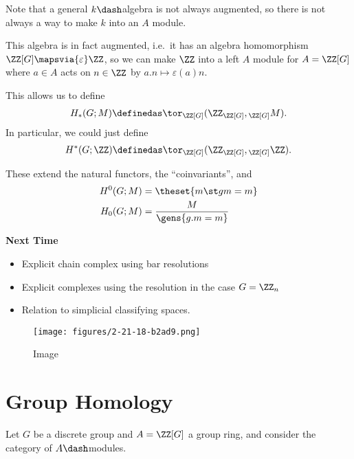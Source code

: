 \begin{remark}

Note that a general \(k\dash\)algebra is not always augmented, so there
is not always a way to make \(k\) into an \(A\) module.

\end{remark}

This algebra is in fact augmented, i.e.~it has an algebra homomorphism
\(\ZZ[G] \mapsvia{\varepsilon} \ZZ\), so we can make \(\ZZ\) into a left
\(A\) module for \(A = \ZZ[G]\) where \(a\in A\) acts on \(n\in \ZZ\) by
\(a.n \mapsto \varepsilon(a)n\).

This allows us to define
\begin{align*}  
H_*(G; M) \definedas \tor_{\ZZ[G]}(\ZZ_{\ZZ[G]}, {}_{\ZZ[G]} M)
.\end{align*} In particular, we could just define
\begin{align*}
H^*(G; \ZZ) \definedas \tor_{\ZZ[G]}(\ZZ_{\ZZ[G]}, {}_{\ZZ[G]} \ZZ)
.\end{align*}

These extend the natural functors, the ``coinvariants'', and
\begin{align*}
H^0(G;M) &= \theset{m\st gm = m} \\
H_0(G; M) &= \frac{M}{\gens{ g.m=m} }
\end{align*}

\textbf{Next Time}

\begin{itemize}
\tightlist
\item
  Explicit chain complex using bar resolutions
\item
  Explicit complexes using the resolution in the case \(G=\ZZ_n\)
\item
  Relation to simplicial classifying spaces.
\end{itemize}

\begin{figure}
\centering
\texttt{[image: figures/2-21-18-b2ad9.png]}
\caption{Image}
\end{figure}

\hypertarget{group-homology}{%
\section{Group Homology}\label{group-homology}}

Let \(G\) be a discrete group and \(A=\ZZ[G]\) a group ring, and
consider the category of \(A\dash\)modules.


